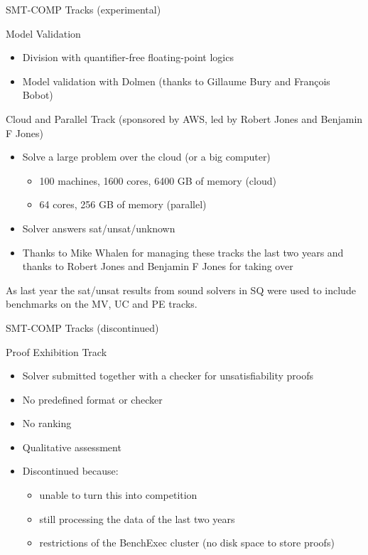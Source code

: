 \documentclass[table]{beamer}
\def\emph#1{\textcolor{MYblue}{#1}}
\begin{document}
\begin{frame}[fragile]{SMT-COMP Tracks (experimental)}

  \emph{Model Validation}
  \begin{itemize}
    \item Division with quantifier-free floating-point logics
    \item Model validation with Dolmen (thanks to Gillaume Bury and Fran\c{c}ois
    Bobot)
  \end{itemize}
  \bigskip

  \emph{Cloud and Parallel Track} (sponsored by AWS, led by Robert Jones and Benjamin F Jones)
  \begin{itemize}
  \item Solve a large problem over the cloud (or a big computer)
  \begin{itemize}
    \item 100 machines, 1600 cores, 6400 GB of memory (cloud)
    \item 64 cores, 256 GB of memory (parallel)
  \end{itemize}
  \item Solver answers sat/unsat/unknown
  \item Thanks to Mike Whalen for managing these tracks the last two years and 
        thanks to Robert Jones and Benjamin F Jones for taking over
  \end{itemize}

\medskip
\pause
  \emph{As last year} the sat/unsat results from sound solvers in SQ were used to
  include benchmarks on the MV, UC and PE tracks.

\end{frame}

\begin{frame}[fragile]{SMT-COMP Tracks (discontinued)}

  \emph{Proof Exhibition Track}
  \begin{itemize}
  \item Solver submitted together with a checker for unsatisfiability proofs
  \item No predefined format or checker
  \item No ranking
  \item Qualitative assessment
  \item Discontinued because:
    \begin{itemize}
    \item unable to turn this into competition
    \item still processing the data of the last two years
    \item restrictions of the BenchExec cluster (no disk space to store proofs)
    \end{itemize}
  \end{itemize}
  

\end{frame}
\end{document}
